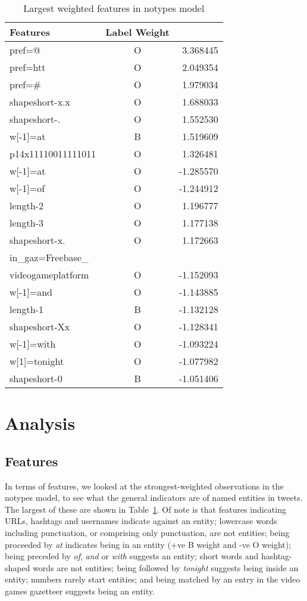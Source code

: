 \documentclass[11pt|a4paper]{article}
\begin{document}
\begin{table}
\centering
\footnotesize
\begin{tabular}{lcr}
\hline
{\bf Features}  & {\bf Label} {\bf Weight} \\
\hline
pref=@ & O& 3.368445\\ 
pref=htt & O& 2.049354\\ 
pref=\# & O& 1.979034\\ 
shapeshort-x.x & O& 1.688033\\ 
shapeshort-. & O& 1.552530\\ 
w[-1]=at & B& 1.519609\\ 
p14x11110011111011 & O& 1.326481\\ 
w[-1]=at & O& -1.285570\\ 
w[-1]=of & O& -1.244912\\ 
length-2 & O& 1.196777\\ 
length-3 & O& 1.177138\\ 
shapeshort-x. & O& 1.172663\\ 
in\_gaz=Freebase\_\\
videogameplatform & O& -1.152093\\ 
w[-1]=and & O& -1.143885\\ 
length-1 & B& -1.132128\\ 
shapeshort-Xx & O& -1.128341\\ 
w[-1]=with & O& -1.093224\\ 
w[1]=tonight & O& -1.077982\\ 
shapeshort-0 & B& -1.051406\\ 
\hline
\end{tabular}
\caption{Largest weighted features in notypes model}
\label{tab:strong-feats}
\end{table}

\section{Analysis}


\subsection{Features}
In terms of features, we looked at the strongest-weighted observations in the notypes model, to see what the general indicators are of named entities in tweets.
The largest of these are shown in Table~\ref{tab:strong-feats}.
Of note is that features indicating URLs, hashtags and usernames indicate against an entity; lowercase words including punctuation, or comprising only punctuation, are not entities; being proceeded by {\em at} indicates being in an entity (+ve B weight and -ve O weight); being preceded by {\em of}, {\em and} or {\em with} suggests an entity; short words and hashtag-shaped words are not entities; being followed by {\em tonight} suggests being inside an entity; numbers rarely start entities; and being matched by an entry in the video games gazetteer suggests being an entity.
\end{document}
